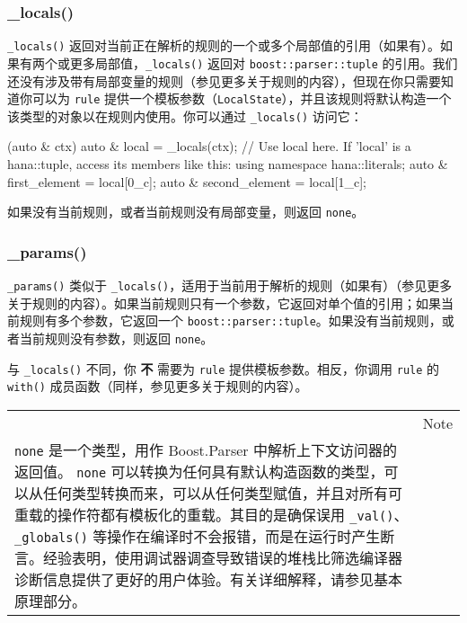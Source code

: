 \subsubsection{\_locals()}

\texttt{\_locals()} 返回对当前正在解析的规则的一个或多个局部值的引用（如果有）。如果有两个或更多局部值，\texttt{\_locals()} 返回对 \texttt{boost::parser::tuple} 的引用。我们还没有涉及带有局部变量的规则（参见更多关于规则的内容），但现在你只需要知道你可以为 \texttt{rule} 提供一个模板参数（\texttt{LocalState}），并且该规则将默认构造一个该类型的对象以在规则内使用。你可以通过 \texttt{\_locals()} 访问它：

\begin{code}
[](auto & ctx) {
    auto & local = _locals(ctx);
    // Use local here.  If 'local' is a hana::tuple, access its members like this:
    using namespace hana::literals;
    auto & first_element = local[0_c];
    auto & second_element = local[1_c];
}
\end{code}

如果没有当前规则，或者当前规则没有局部变量，则返回 \texttt{none}。

\subsubsection{\_params()}

\texttt{\_params()} 类似于 \texttt{\_locals()}，适用于当前用于解析的规则（如果有）（参见更多关于规则的内容）。如果当前规则只有一个参数，它返回对单个值的引用；如果当前规则有多个参数，它返回一个 \texttt{boost::parser::tuple}。如果没有当前规则，或者当前规则没有参数，则返回 \texttt{none}。

与 \texttt{\_locals()} 不同，你 \textbf{不} 需要为 \texttt{rule} 提供模板参数。相反，你调用 \texttt{rule} 的 \texttt{with()} 成员函数（同样，参见更多关于规则的内容）。

\begin{longtable}[]{@{}
  >{\raggedright\arraybackslash}p{}
  >{\raggedright\arraybackslash}p{}@{}}
\toprule\noalign{}
\endhead
\bottomrule\noalign{}
\endlastfoot
\begin{minipage}[t]{\linewidth}\raggedright
\end{minipage} & Note \\
\texttt{none} 是一个类型，用作 Boost.Parser 中解析上下文访问器的返回值。 \texttt{none} 可以转换为任何具有默认构造函数的类型，可以从任何类型转换而来，可以从任何类型赋值，并且对所有可重载的操作符都有模板化的重载。其目的是确保误用 \texttt{\_val()}、\texttt{\_globals()} 等操作在编译时不会报错，而是在运行时产生断言。经验表明，使用调试器调查导致错误的堆栈比筛选编译器诊断信息提供了更好的用户体验。有关详细解释，请参见基本原理部分。 & \\
\end{longtable}

